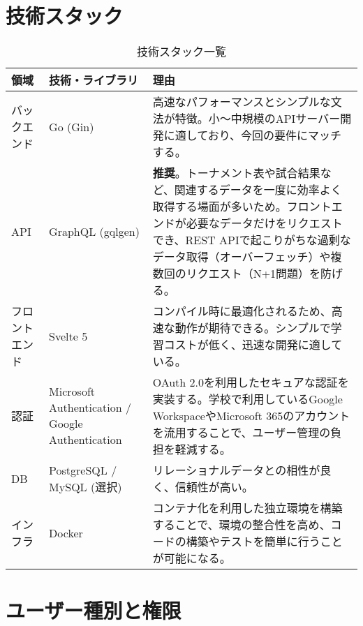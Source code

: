 \documentclass[12pt]{ltjsarticle} %
\begin{document}
\section{技術スタック}

\begin{table}[H]
    \centering
    \caption{技術スタック一覧}
    \label{tab:tech_stack}
    \begin{tabular}{lp{4cm}p{7cm}}
        \toprule
        \textbf{領域} & \textbf{技術・ライブラリ} & \textbf{理由} \\
        \midrule
        バックエンド & Go (Gin) & 高速なパフォーマンスとシンプルな文法が特徴。小〜中規模のAPIサーバー開発に適しており、今回の要件にマッチする。 \\
        \addlinespace
        API & GraphQL (gqlgen) & \textbf{推奨}。トーナメント表や試合結果など、関連するデータを一度に効率よく取得する場面が多いため。フロントエンドが必要なデータだけをリクエストでき、REST APIで起こりがちな過剰なデータ取得（オーバーフェッチ）や複数回のリクエスト（N+1問題）を防げる。 \\
        \addlinespace
        フロントエンド & Svelte 5 & コンパイル時に最適化されるため、高速な動作が期待できる。シンプルで学習コストが低く、迅速な開発に適している。 \\
        \addlinespace
        認証 & Microsoft Authentication / Google Authentication & OAuth 2.0を利用したセキュアな認証を実装する。学校で利用しているGoogle WorkspaceやMicrosoft 365のアカウントを流用することで、ユーザー管理の負担を軽減する。 \\
        \addlinespace
        DB & PostgreSQL / MySQL (選択) & リレーショナルデータとの相性が良く、信頼性が高い。 \\
        \addlinespace
        インフラ & Docker & コンテナ化を利用した独立環境を構築することで、環境の整合性を高め、コードの構築やテストを簡単に行うことが可能になる。 \\
        \bottomrule
    \end{tabular}
\end{table}

\section{ユーザー種別と権限}
\end{document}

